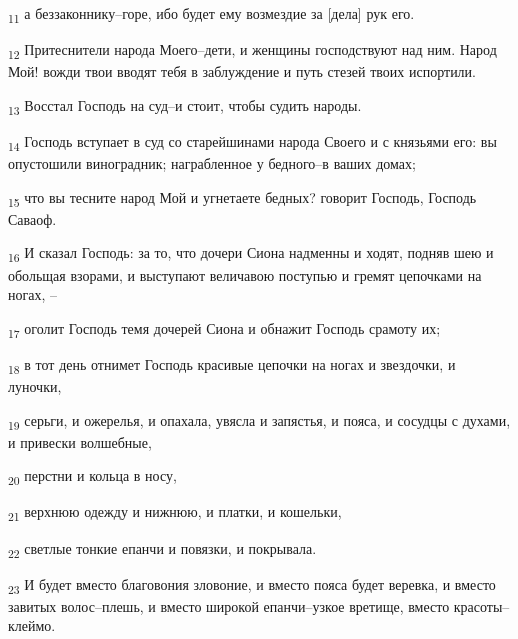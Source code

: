 \begin{tcolorbox}
\textsubscript{11} а беззаконнику--горе, ибо будет ему возмездие за [дела] рук его.
\end{tcolorbox}
\begin{tcolorbox}
\textsubscript{12} Притеснители народа Моего--дети, и женщины господствуют над ним. Народ Мой! вожди твои вводят тебя в заблуждение и путь стезей твоих испортили.
\end{tcolorbox}
\begin{tcolorbox}
\textsubscript{13} Восстал Господь на суд--и стоит, чтобы судить народы.
\end{tcolorbox}
\begin{tcolorbox}
\textsubscript{14} Господь вступает в суд со старейшинами народа Своего и с князьями его: вы опустошили виноградник; награбленное у бедного--в ваших домах;
\end{tcolorbox}
\begin{tcolorbox}
\textsubscript{15} что вы тесните народ Мой и угнетаете бедных? говорит Господь, Господь Саваоф.
\end{tcolorbox}
\begin{tcolorbox}
\textsubscript{16} И сказал Господь: за то, что дочери Сиона надменны и ходят, подняв шею и обольщая взорами, и выступают величавою поступью и гремят цепочками на ногах, --
\end{tcolorbox}
\begin{tcolorbox}
\textsubscript{17} оголит Господь темя дочерей Сиона и обнажит Господь срамоту их;
\end{tcolorbox}
\begin{tcolorbox}
\textsubscript{18} в тот день отнимет Господь красивые цепочки на ногах и звездочки, и луночки,
\end{tcolorbox}
\begin{tcolorbox}
\textsubscript{19} серьги, и ожерелья, и опахала, увясла и запястья, и пояса, и сосудцы с духами, и привески волшебные,
\end{tcolorbox}
\begin{tcolorbox}
\textsubscript{20} перстни и кольца в носу,
\end{tcolorbox}
\begin{tcolorbox}
\textsubscript{21} верхнюю одежду и нижнюю, и платки, и кошельки,
\end{tcolorbox}
\begin{tcolorbox}
\textsubscript{22} светлые тонкие епанчи и повязки, и покрывала.
\end{tcolorbox}
\begin{tcolorbox}
\textsubscript{23} И будет вместо благовония зловоние, и вместо пояса будет веревка, и вместо завитых волос--плешь, и вместо широкой епанчи--узкое вретище, вместо красоты--клеймо.
\end{tcolorbox}
